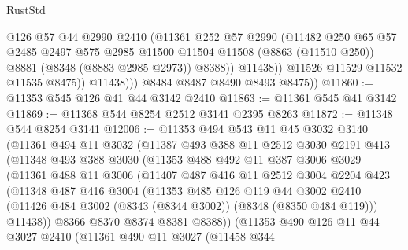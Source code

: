 \begin{lexlean}{RustStd}
\begin{coremodule}
{\begin{coremodule}
{{{{{{{{{{{{{{{{{{{{{{{{{{{{{{{{{{{{{{{{{{{{{{{{{{                      @126
                      @57
                      @44
                      @2990
                      @2410
                      (@11361
                        @252
                        @57
                        @2990
                        (@11482
                          @250
                          @65
                          @57
                          @2485
                          @2497
                          @575
                          @2985
                          @11500
                          @11504
                          @11508
                          (@8863 (@11510 @250))
                          @8881
                          (@8348 (@8883 @2985 @2973))
                          @8388))
                      @11438))
                  @11526
                  @11529
                  @11532
                  @11535
                  @8475))
              @11438)))
        @8484
        @8487
        @8490
        @8493
        @8475))
@11860 := @11353 @545 @126 @41 @44 @3142 @2410
@11863 := @11361 @545 @41 @3142
@11869 := @11368 @544 @8254 @2512 @3141 @2395 @8263
@11872 := @11348 @544 @8254 @3141
@12006 := @11353
    @494
    @543
    @11
    @45
    @3032
    @3140
    (@11361
      @494
      @11
      @3032
      (@11387
        @493
        @388
        @11
        @2512
        @3030
        @2191
        @413
        (@11348
          @493
          @388
          @3030
          (@11353
            @488
            @492
            @11
            @387
            @3006
            @3029
            (@11361
              @488
              @11
              @3006
              (@11407
                @487
                @416
                @11
                @2512
                @3004
                @2204
                @423
                (@11348
                  @487
                  @416
                  @3004
                  (@11353
                    @485
                    @126
                    @119
                    @44
                    @3002
                    @2410
                    (@11426 @484 @3002 (@8343 (@8344 @3002)) (@8348 (@8350 @484 @119)))
                    @11438))
                @8366
                @8370
                @8374
                @8381
                @8388))
            (@11353
              @490
              @126
              @11
              @44
              @3027
              @2410
              (@11361
                @490
                @11
                @3027
                (@11458
                  @344
}}}}}}}}}}}}}}}}}}}}}}}}}}}}}}}}}}}}}}}}}}}}}}}}}}
\end{coremodule}}
\end{coremodule}
\end{lexlean}
